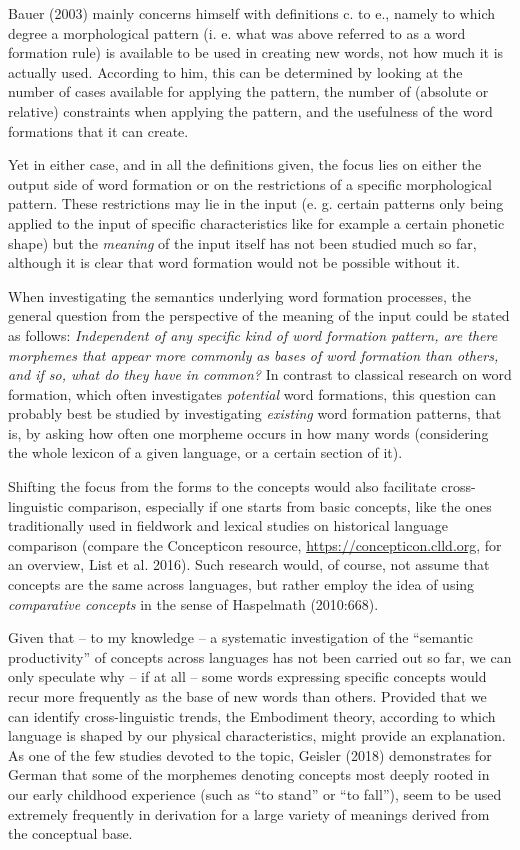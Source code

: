 \documentclass[
  a4paper,
  14pt,
  oneside,
  tablecaptionabove
]{scrbook}
\begin{document}
Bauer (2003) mainly concerns himself with definitions c. to e., namely
to which degree a morphological pattern (i. e. what was above referred
to as a word formation rule) is available to be used in creating new
words, not how much it is actually used. According to him, this can be
determined by looking at the number of cases available for applying the
pattern, the number of (absolute or relative) constraints when applying
the pattern, and the usefulness of the word formations that it can
create.

Yet in either case, and in all the definitions given, the focus lies on
either the output side of word formation or on the restrictions of a
specific morphological pattern. These restrictions may lie in the input
(e. g. certain patterns only being applied to the input of specific
characteristics like for example a certain phonetic shape) but the
\emph{meaning} of the input itself has not been studied much so far,
although it is clear that word formation would not be possible without
it.

When investigating the semantics underlying word formation processes,
the general question from the perspective of the meaning of the input
could be stated as follows: \emph{Independent of any specific kind of
word formation pattern, are there morphemes that appear more commonly}
\emph{as bases of word formation than others, and if so, what do they
have in common?} In contrast to classical research on word formation,
which often investigates \emph{potential} word formations, this question
can probably best be studied by investigating \emph{existing} word
formation patterns, that is, by asking how often one morpheme occurs in
how many words (considering the whole lexicon of a given language, or a
certain section of it).

Shifting the focus from the forms to the concepts would also facilitate
cross-linguistic comparison, especially if one starts from basic
concepts, like the ones traditionally used in fieldwork and lexical
studies on historical language comparison (compare the Concepticon
resource,
\href{https://concepticon.clld.org/}{https://concepticon.clld.org}, for
an overview, List et al. 2016). Such research would, of course, not
assume that concepts are the same across languages, but rather employ
the idea of using \emph{comparative concepts} in the sense of Haspelmath
(2010:668).

Given that -- to my knowledge -- a systematic investigation of the
\enquote{semantic productivity} of concepts across languages has not
been carried out so far, we can only speculate why -- if at all -- some
words expressing specific concepts would recur more frequently as the
base of new words than others. Provided that we can identify
cross-linguistic trends, the Embodiment theory, according to which
language is shaped by our physical characteristics, might provide an
explanation. As one of the few studies devoted to the topic, Geisler
(2018) demonstrates for German that some of the morphemes denoting
concepts most deeply rooted in our early childhood experience (such as
\enquote{to stand} or \enquote{to fall}), seem to be used extremely
frequently in derivation for a large variety of meanings derived from
the conceptual base.
\end{document}
